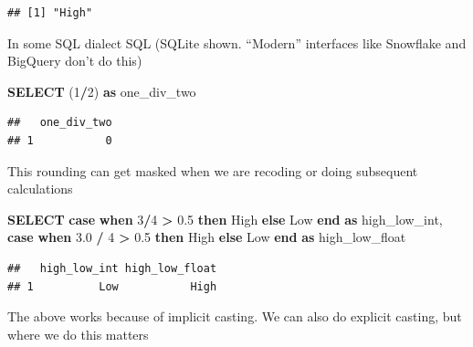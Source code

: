 \documentclass[
]{krantz}
\makeatletter
\newenvironment{Shaded}{\begin{snugshade}}{\end{snugshade}}
\newcommand{\ControlFlowTok}[1]{\textcolor[rgb]{0.27,0.27,0.27}{\textbf{#1}}}
\newcommand{\DecValTok}[1]{\textcolor[rgb]{0.06,0.06,0.06}{#1}}
\newcommand{\FloatTok}[1]{\textcolor[rgb]{0.06,0.06,0.06}{#1}}
\newcommand{\KeywordTok}[1]{\textcolor[rgb]{0.27,0.27,0.27}{\textbf{#1}}}
\newcommand{\NormalTok}[1]{#1}
\newcommand{\OperatorTok}[1]{\textcolor[rgb]{0.43,0.43,0.43}{\textbf{#1}}}
\newcommand{\StringTok}[1]{\textcolor[rgb]{0.5,0.5,0.5}{#1}}
\newenvironment{kframe}{%
\medskip{}
\setlength{\fboxsep}{.8em}
 \def\at@end@of@kframe{}%
 \ifinner\ifhmode%
  \def\at@end@of@kframe{\end{minipage}}%
  \begin{minipage}{\columnwidth}%
 \fi\fi%
 \def\FrameCommand##1{\hskip\@totalleftmargin \hskip-\fboxsep
 \colorbox{shadecolor}{##1}\hskip-\fboxsep
     \hskip-\linewidth \hskip-\@totalleftmargin \hskip\columnwidth}%
 \MakeFramed {\advance\hsize-\width
   \@totalleftmargin\z@ \linewidth\hsize
   \@setminipage}}%
 {\par\unskip\endMakeFramed%
 \at@end@of@kframe}
\renewenvironment{Shaded}{\begin{kframe}}{\end{kframe}}
\makeatother
\begin{document}
\begin{verbatim}
## [1] "High"
\end{verbatim}

In some SQL dialect SQL (SQLite shown. ``Modern'' interfaces like Snowflake and BigQuery don't do this)

\begin{Shaded}
\begin{Highlighting}[]
\KeywordTok{SELECT}\NormalTok{ (}\DecValTok{1}\OperatorTok{/}\DecValTok{2}\NormalTok{) }\KeywordTok{as}\NormalTok{ one\_div\_two}
\end{Highlighting}
\end{Shaded}

\begin{verbatim}
##   one_div_two
## 1           0
\end{verbatim}

This rounding can get masked when we are recoding or doing subsequent calculations

\begin{Shaded}
\begin{Highlighting}[]
\KeywordTok{SELECT}
  \ControlFlowTok{case}
    \ControlFlowTok{when} \DecValTok{3}\OperatorTok{/}\DecValTok{4} \OperatorTok{\textgreater{}} \FloatTok{0.5} \ControlFlowTok{then} \StringTok{\textquotesingle{}High\textquotesingle{}} 
    \ControlFlowTok{else} \StringTok{\textquotesingle{}Low\textquotesingle{}}
  \ControlFlowTok{end} \KeywordTok{as}\NormalTok{ high\_low\_int,}
  \ControlFlowTok{case}
    \ControlFlowTok{when} \FloatTok{3.0} \OperatorTok{/} \DecValTok{4} \OperatorTok{\textgreater{}} \FloatTok{0.5} \ControlFlowTok{then} \StringTok{\textquotesingle{}High\textquotesingle{}}
    \ControlFlowTok{else} \StringTok{\textquotesingle{}Low\textquotesingle{}}
  \ControlFlowTok{end} \KeywordTok{as}\NormalTok{ high\_low\_float}
\end{Highlighting}
\end{Shaded}

\begin{verbatim}
##   high_low_int high_low_float
## 1          Low           High
\end{verbatim}

The above works because of implicit casting. We can also do explicit casting, but where we do this matters
\end{document}
